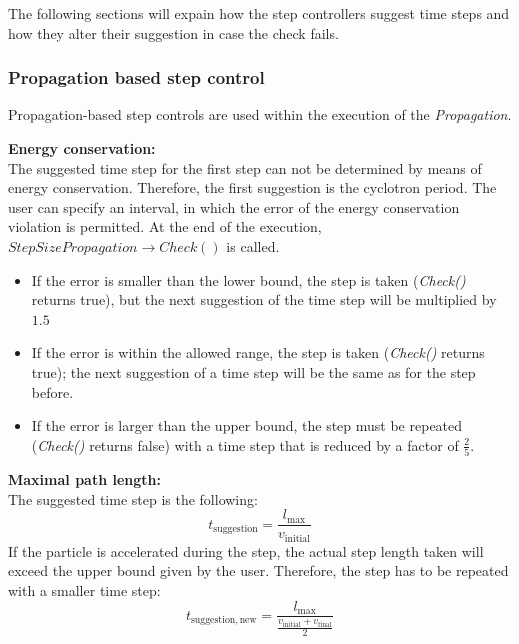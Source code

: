 The following sections will expain how the step controllers suggest time steps and how they alter their suggestion in case the check fails.
 

    \subsubsection*{Propagation based step control}
    Propagation-based step controls are used within the execution of the \textit{Propagation}.
        
        \textbf{Energy conservation:}\\
        The suggested time step for the first step can not be determined by means of energy conservation. Therefore, the first suggestion is the cyclotron period. 
        The user can specify an interval, in which the error of the energy conservation violation is permitted. At the end of the execution, \textit{$StepSizePropagation\rightarrow Check()$} is called. 
        \begin{itemize}
            \item If the error is smaller than the lower bound, the step is taken (\textit{Check()} returns true), but the next suggestion of the time step will be multiplied by $1.5$
            \item If the error is within the allowed range, the step is taken (\textit{Check()} returns true); the next suggestion of a time step will be the same as for the step before.
            \item If the error is larger than the upper bound, the step must be repeated (\textit{Check()} returns false) with a time step that is reduced by a factor of $\frac{2}{5}$.
        \end{itemize}
        
        \textbf{Maximal path length:}\\
        The suggested time step is the following:
        \begin{equation}
            t_{\mathrm{suggestion}} = \frac{l_{\mathrm{max}}}{v_{\mathrm{initial}}} 
        \end{equation}
        If the particle is accelerated during the step, the actual step length taken will exceed the upper bound given by the user. Therefore, the step has to be repeated with a smaller time step:
        \begin{equation}
            t_{\mathrm{suggestion,new}} = \frac{l_{\mathrm{max}}}{\frac{v_{\mathrm{initial}}+v_{\mathrm{final}}}{2}} 
        \end{equation}
        
